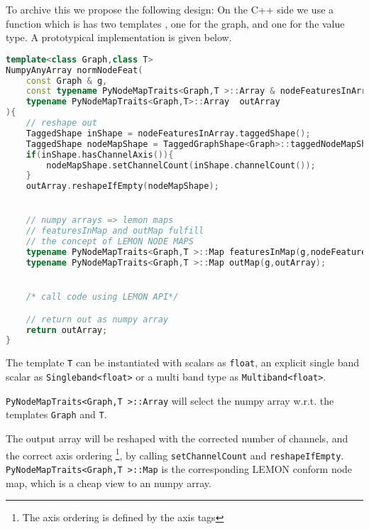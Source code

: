 \begin{minipage}{\textwidth}

To archive this we propose the following design:
On the C++ side we use a function  which
is has two templates , one for the graph, and one for the value type.
A prototypical implementation is given below.

\begin{lstlisting}[language=c++]
template<class Graph,class T>
NumpyAnyArray normNodeFeat(
    const Graph & g,
    const typename PyNodeMapTraits<Graph,T >::Array & nodeFeaturesInArray,
    typename PyNodeMapTraits<Graph,T>::Array  outArray 
){
    // reshape out 
    TaggedShape inShape = nodeFeaturesInArray.taggedShape();
    TaggedShape nodeMapShape = TaggedGraphShape<Graph>::taggedNodeMapShape(graph);
    if(inShape.hasChannelAxis()){
        nodeMapShape.setChannelCount(inShape.channelCount());
    }
    outArray.reshapeIfEmpty(nodeMapShape);


    // numpy arrays => lemon maps 
    // featuresInMap and outMap fulfill
    // the concept of LEMON NODE MAPS
    typename PyNodeMapTraits<Graph,T >::Map featuresInMap(g,nodeFeaturesInArray);
    typename PyNodeMapTraits<Graph,T >::Map outMap(g,outArray);


    /* call code using LEMON API*/

    // return out as numpy array
    return outArray;
}
\end{lstlisting}

The template \lstinline{T} can be instantiated with scalars as \lstinline{float}, an explicit single band scalar as \lstinline{Singleband<float>}
or a multi band type as \lstinline{Multiband<float>}.

\lstinline{PyNodeMapTraits<Graph,T >::Array} will select the numpy array w.r.t.
the templates \lstinline{Graph} and \lstinline{T}.

The output array will be reshaped with the corrected number of channels,
and the correct axis ordering \footnote{The axis ordering is defined by the axis tags}, by calling \lstinline{setChannelCount}
and \lstinline{reshapeIfEmpty}.
\lstinline{PyNodeMapTraits<Graph,T >::Map} is the corresponding LEMON conform  node map,
which is a cheap view to an numpy array. 
\end{minipage}



